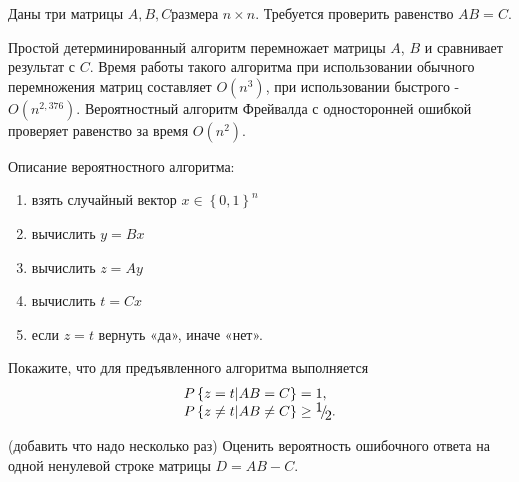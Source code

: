 \begin{problem}

Даны три матрицы $A,B,C$размера $n\times n$. Требуется проверить равенство $AB=C$.

Простой детерминированный алгоритм перемножает матрицы $A$, $B$ и сравнивает результат с $C$. Время работы такого алгоритма при использовании обычного перемножения матриц составляет $O(n^{3} )$, при использовании быстрого - $O(n^{2,376} )$. Вероятностный алгоритм Фрейвалда с односторонней ошибкой проверяет равенство за время $O(n^{2} )$.

Описание вероятностного алгоритма:

\begin{enumerate}
\item \textbf{ }взять случайный вектор $x\in \left\{0,1\right\}^{n} $

\item  вычислить $y=Bx$

\item  вычислить $z=Ay$

\item  вычислить $t=Cx$

\item  если $z=t$ вернуть «да», иначе «нет».
\end{enumerate}

Покажите, что для предъявленного алгоритма выполняется 
\[\begin{array}{l} {P\left\{z=t \vert AB=C\right\}=1,} \\ {P\left\{z \neq t \vert AB\ne C\right\}\ge {\raise0.7ex\hbox{$ 1 $}\!\mathord{\left/ {\vphantom {1 2}} \right. \kern-\nulldelimiterspace}\!\lower0.7ex\hbox{$ 2 $}} .} \end{array}\] 

\begin{ordre} (добавить что надо несколько раз)
Оценить вероятность ошибочного ответа на одной ненулевой строке матрицы $D = AB - C$. 
\end{ordre}

\end{problem}

